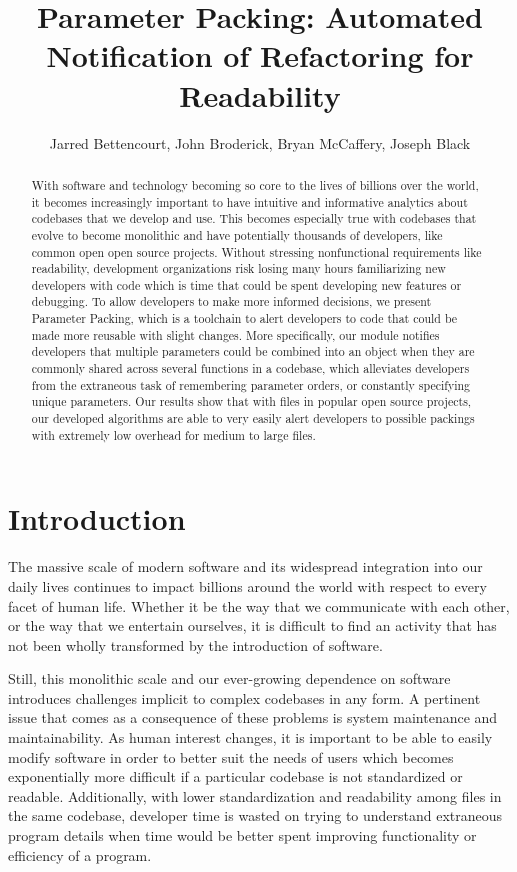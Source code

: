 \documentclass{article}
\title{Parameter Packing: Automated Notification of Refactoring for Readability}
\author{Jarred Bettencourt, John Broderick, Bryan McCaffery, Joseph Black}
\begin{document}
\maketitle 

\begin{abstract}
With software and technology becoming so core to the lives of billions over the world, it becomes increasingly important to have intuitive and informative analytics about codebases that we develop and use. This becomes especially true with codebases that evolve to become monolithic and have potentially thousands of developers, like common open open source projects. Without stressing nonfunctional requirements like readability, development organizations risk losing many hours familiarizing new developers with code which is time that could be spent developing new features or debugging. To allow developers to make more informed decisions, we present Parameter Packing, which is a toolchain to alert developers to code that could be made more reusable with slight changes. More specifically, our module notifies developers that multiple parameters could be combined into an object when they are commonly shared across several functions in a codebase, which alleviates developers from the extraneous task of remembering parameter orders, or constantly specifying unique parameters. Our results show that with files in popular open source projects, our developed algorithms are able to very easily alert developers to possible packings with extremely low overhead for medium to large files.  
\end{abstract}

\section{Introduction}

The massive scale of modern software and its widespread integration into our daily lives continues to impact billions around the world with respect to every facet of human life. Whether it be the way that we communicate with each other, or the way that we entertain ourselves, it is difficult to find an activity that has not been wholly transformed by the introduction of software.

Still, this monolithic scale and our ever-growing dependence on software introduces challenges implicit to complex codebases in any form. A pertinent issue that comes as a consequence of these problems is system maintenance and maintainability. As human interest changes, it is important to be able to easily modify software in order to better suit the needs of users which becomes exponentially more difficult if a particular codebase is not standardized or readable. Additionally, with lower standardization and readability among files in the same codebase, developer time is wasted on trying to understand extraneous program details when time would be better spent improving functionality or efficiency of a program.
\end{document}
